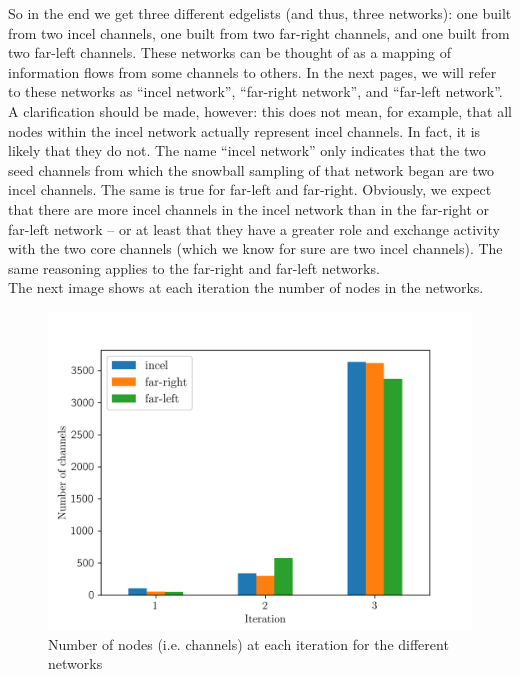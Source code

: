 \documentclass[a4paper,twoside,12pt, openany]{book}
\begin{document}
So in the end we get three different edgelists (and thus, three networks): one built from two incel channels, one built from two far-right channels, and one built from two far-left channels. These networks can be thought of as a mapping of information flows from some channels to others. In the next pages, we will refer to these networks as “incel network”, “far-right network”, and “far-left network”. A clarification should be made, however: this does not mean, for example, that all nodes within the incel network actually represent incel channels. In fact, it is likely that they do not. The name “incel network” only indicates that the two seed channels from which the snowball sampling of that network began are two incel channels. The same is true for far-left and far-right. Obviously, we expect that there are more incel channels in the incel network than in the far-right or far-left network – or at least that they have a greater role and exchange activity with the two core channels (which we know for sure are two incel channels). The same reasoning applies to the far-right and far-left networks.\\
The next image shows at each iteration the number of nodes in the networks.
\pagebreak

\begin{figure}[h!]
	\centering
	\includegraphics[scale=0.7]{n_nodes_output.png}
	\caption{Number of nodes (i.e.  channels) at each iteration for the different networks}
\end{figure}
\end{document}
